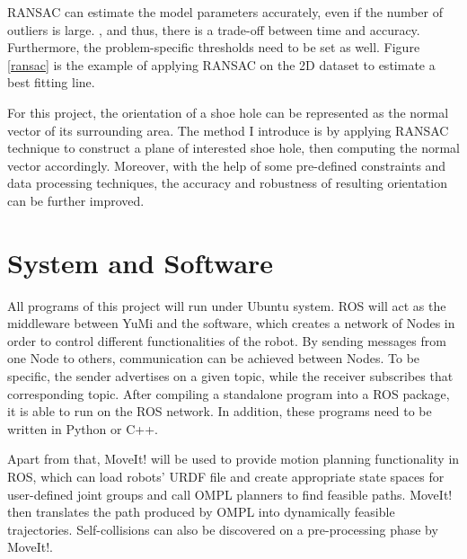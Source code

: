 RANSAC can estimate the model parameters accurately, even if the number of outliers is large. , and thus, there is a trade-off between time and accuracy. Furthermore, the problem-specific thresholds need to be set as well. Figure \ref{ransac} is the example of applying RANSAC on the 2D dataset to estimate a best fitting line.

For this project, the orientation of a shoe hole can be represented as the normal vector of its surrounding area. The method I introduce is by applying RANSAC technique to construct a plane of interested shoe hole, then computing the normal vector accordingly. Moreover, with the help of some pre-defined constraints and data processing techniques, the accuracy and robustness of resulting orientation can be further improved.

\section{System and Software}
All programs of this project will run under Ubuntu system. ROS will act as the middleware between YuMi and the software, which creates a network of Nodes in order to control different functionalities of the robot. By sending messages from one Node to others, communication can be achieved between Nodes. To be specific, the sender advertises on a given topic, while the receiver subscribes that corresponding topic. After compiling a standalone program into a ROS package, it is able to run on the ROS network. In addition, these programs need to be written in Python or C++.

Apart from that, MoveIt! will be used to provide motion planning functionality in ROS, which can load robots' URDF file and create appropriate state spaces for user-defined joint groups and call OMPL planners to find feasible paths. MoveIt! then translates the path produced by OMPL into dynamically feasible trajectories. Self-collisions can also be discovered on a pre-processing phase by MoveIt!.